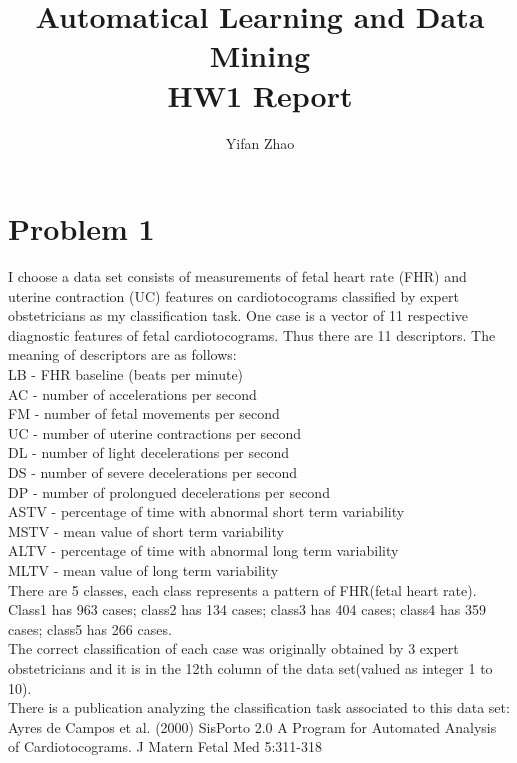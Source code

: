 \documentclass{article}
\author{Yifan Zhao}
\title{Automatical Learning and Data Mining\\HW1 Report}
\begin{document}
 \maketitle
 \section{Problem 1}
 I choose a data set consists of measurements of fetal heart rate (FHR) and uterine contraction (UC) features on cardiotocograms classified by expert obstetricians as my classification task. One case is a vector of 11 respective diagnostic features of fetal cardiotocograms. Thus there are 11 descriptors. The meaning of descriptors are as follows:\\
LB - FHR baseline (beats per minute)\\
AC - number of accelerations per second\\
FM - number of fetal movements per second\\
UC - number of uterine contractions per second\\
DL - number of light decelerations per second\\
DS - number of severe decelerations per second\\
DP - number of prolongued decelerations per second\\
ASTV - percentage of time with abnormal short term variability\\
MSTV - mean value of short term variability\\
ALTV - percentage of time with abnormal long term variability\\
MLTV - mean value of long term variability\\
There are 5 classes, each class represents a pattern of FHR(fetal heart rate). Class1 has 963 cases; class2 has 134 cases; class3 has 404 cases; class4 has 359 cases; class5 has 266 cases.\\
The correct classification of each case was originally obtained by 3 expert obstetricians and it is in the 12th column of the data set(valued as integer 1 to 10).\\
There is a publication analyzing the classification task associated to this data set:\\
Ayres de Campos et al. (2000) SisPorto 2.0 A Program for Automated Analysis of Cardiotocograms. J Matern Fetal Med 5:311-318
\end{document}
